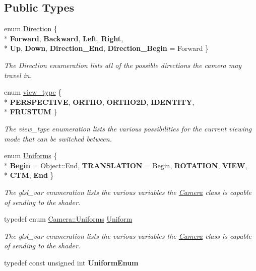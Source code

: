 \subsection*{Public Types}
\begin{DoxyCompactItemize}
\item 
enum \hyperlink{class_camera_a80cb65605322d27ad3b6d973484509ec}{Direction} \{ \\*
{\bfseries Forward}, 
{\bfseries Backward}, 
{\bfseries Left}, 
{\bfseries Right}, 
\\*
{\bfseries Up}, 
{\bfseries Down}, 
{\bfseries Direction\-\_\-\-End}, 
{\bfseries Direction\-\_\-\-Begin} =  Forward
 \}
\begin{DoxyCompactList}\small\item\em The Direction enumeration lists all of the possible directions the camera may travel in. \end{DoxyCompactList}\item 
enum \hyperlink{class_camera_afdccec6d447490dcc80ab6b99f21d0e5}{view\-\_\-type} \{ \\*
{\bfseries P\-E\-R\-S\-P\-E\-C\-T\-I\-V\-E}, 
{\bfseries O\-R\-T\-H\-O}, 
{\bfseries O\-R\-T\-H\-O2\-D}, 
{\bfseries I\-D\-E\-N\-T\-I\-T\-Y}, 
\\*
{\bfseries F\-R\-U\-S\-T\-U\-M}
 \}
\begin{DoxyCompactList}\small\item\em The view\-\_\-type enumeration lists the various possibilities for the current viewing mode that can be switched between. \end{DoxyCompactList}\item 
enum \hyperlink{class_camera_a630738fd23098d44c0d15ee28d5649dd}{Uniforms} \{ \\*
{\bfseries Begin} =  Object\-:\-:End, 
{\bfseries T\-R\-A\-N\-S\-L\-A\-T\-I\-O\-N} =  Begin, 
{\bfseries R\-O\-T\-A\-T\-I\-O\-N}, 
{\bfseries V\-I\-E\-W}, 
\\*
{\bfseries C\-T\-M}, 
{\bfseries End}
 \}
\begin{DoxyCompactList}\small\item\em The glsl\-\_\-var enumeration lists the various variables the \hyperlink{class_camera}{Camera} class is capable of sending to the shader. \end{DoxyCompactList}\item 
typedef enum \hyperlink{class_camera_a630738fd23098d44c0d15ee28d5649dd}{Camera\-::\-Uniforms} \hyperlink{class_camera_a0ed19c96505cbb70625938d1e883af24}{Uniform}
\begin{DoxyCompactList}\small\item\em The glsl\-\_\-var enumeration lists the various variables the \hyperlink{class_camera}{Camera} class is capable of sending to the shader. \end{DoxyCompactList}\item 
\hypertarget{class_object_a79b74057dbc5182b85c9c3ba8480fcf2}{typedef const unsigned int {\bfseries Uniform\-Enum}}\label{class_object_a79b74057dbc5182b85c9c3ba8480fcf2}

\end{DoxyCompactItemize}
